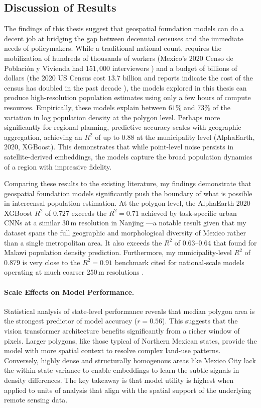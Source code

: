\documentclass[12pt,letterpaper]{article}
\begin{document}
\subsection{Discussion of Results}
The findings of this thesis suggest that geospatial foundation models can do a decent job at bridging the gap between decennial censuses and the immediate needs of policymakers. While a traditional national count, requires the mobilization of hundreds of thousands of workers (Mexico's 2020 Censo de Población y Vivienda had $151,000$ interviewers \parencite{inegi2020censo}) and a budget of billions of dollars (the 2020 US Census cost $13.7$ billion and reports indicate the cost of the census has doubled in the past decade \parencite{gao2023census, farmer2018census}), the models explored in this thesis can produce high-resolution population estimates using only a few hours of compute resources. Empirically, these models explain between $61\%$ and $73\%$ of the variation in log population density at the polygon level. Perhaps more significantly for regional planning, predictive accuracy scales with geographic aggregation, achieving an $R^2$ of up to $0.88$ at the municipality level (AlphaEarth, 2020, XGBoost). This demonstrates that while point-level noise persists in satellite-derived embeddings, the models capture the broad population dynamics of a region with impressive fidelity.

Comparing these results to the existing literature, my findings demonstrate that geospatial foundation models significantly push the boundary of what is possible in intercensal population estimation. At the polygon level, the AlphaEarth 2020 XGBoost $R^2$ of $0.727$ exceeds the $R^2 = 0.71$ achieved by task-specific urban CNNs at a similar 30\,m resolution in Nanjing \parencite{SONG2019103580}---a notable result given that my dataset spans the full geographic and morphological diversity of Mexico rather than a single metropolitan area. It also exceeds the $R^2$ of 0.63--0.64 that \textcite{metz2025application} found for Malawi population density prediction. Furthermore, my municipality-level $R^2$ of $0.879$ is very close to the $R^2 = 0.91$ benchmark cited for national-scale models operating at much coarser 250\,m resolutions \parencite{rs11222620}. 


\paragraph{Scale Effects on Model Performance.}
Statistical analysis of state-level performance reveals that median polygon area is the strongest predictor of model accuracy ($r=0.56$). This suggests that the vision transformer architecture benefits significantly from a richer window of pixels. Larger polygons, like those typical of Northern Mexican states, provide the model with more spatial context to resolve complex land-use patterns. Conversely, highly dense and structurally homogenous areas like Mexico City lack the within-state variance to enable embeddings to learn the subtle signals in density differences. The key takeaway is that model utility is highest when applied to units of analysis that align with the spatial support of the underlying remote sensing data.
\end{document}
